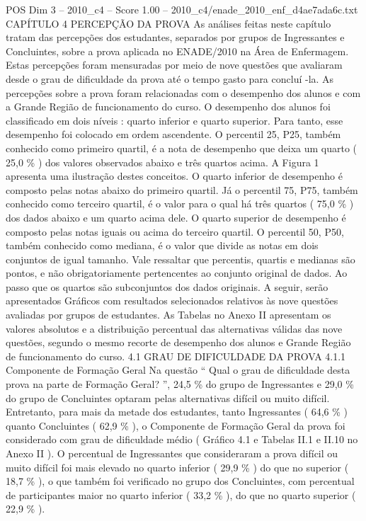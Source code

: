 \begin{textsample}{POS Dim 3 – 2010\_c4 – Score 1.00 – 2010\_c4/enade\_2010\_enf\_d4ae7ada6c.txt}  \label{ex:f3_pos_145}
CAPÍTULO 4 PERCEPÇÃO DA PROVA As análises feitas neste capítulo tratam das percepções dos estudantes, separados por grupos de Ingressantes e Concluintes, sobre a prova aplicada no ENADE/2010 na Área de Enfermagem.
Estas percepções foram mensuradas por meio de nove questões que avaliaram desde o grau de dificuldade da prova até o tempo gasto para concluí -la.
As percepções sobre a prova foram relacionadas com o desempenho dos alunos e com a Grande Região de funcionamento do curso.
O desempenho dos alunos foi classificado em dois níveis : quarto inferior e quarto superior.
Para tanto, esse desempenho foi colocado em ordem ascendente.
O percentil 25, P25, também conhecido como primeiro quartil, é a nota de desempenho que deixa um quarto ( 25,0 \% ) dos valores observados abaixo e três quartos acima.
A Figura 1 apresenta uma ilustração destes conceitos.
O quarto inferior de desempenho é composto pelas notas abaixo do primeiro quartil.
Já o percentil 75, P75, também conhecido como terceiro quartil, é o valor para o qual há três quartos ( 75,0 \% ) dos dados abaixo e um quarto acima dele.
O quarto superior de desempenho é composto pelas notas iguais ou acima do terceiro quartil.
O percentil 50, P50, também conhecido como mediana, é o valor que divide as notas em dois conjuntos de igual tamanho.
Vale ressaltar que percentis, quartis e medianas são pontos, e não obrigatoriamente pertencentes ao conjunto original de dados.
Ao passo que os quartos são subconjuntos dos dados originais.
A seguir, serão apresentados Gráficos com resultados selecionados relativos às nove questões avaliadas por grupos de estudantes.
As Tabelas no Anexo II apresentam os valores absolutos e a distribuição percentual das alternativas válidas das nove questões, segundo o mesmo recorte de desempenho dos alunos e Grande Região de funcionamento do curso. 4.1 GRAU DE DIFICULDADE DA PROVA 4.1.1 Componente de Formação Geral Na questão “ Qual o grau de dificuldade desta prova na parte de Formação Geral? ”, 24,5 \% do grupo de Ingressantes e 29,0 \% do grupo de Concluintes optaram pelas alternativas difícil ou muito difícil.
Entretanto, para mais da metade dos estudantes, tanto Ingressantes ( 64,6 \% ) quanto Concluintes ( 62,9 \% ), o Componente de Formação Geral da prova foi considerado com grau de dificuldade médio ( Gráfico 4.1 e Tabelas II.1 e II.10 no Anexo II ).
O percentual de Ingressantes que consideraram a prova difícil ou muito difícil foi mais elevado no quarto inferior ( 29,9 \% ) do que no superior ( 18,7 \% ), o que também foi verificado no grupo dos Concluintes, com percentual de participantes maior no quarto inferior ( 33,2 \% ), do que no quarto superior ( 22,9 \% ).

\end{textsample}
